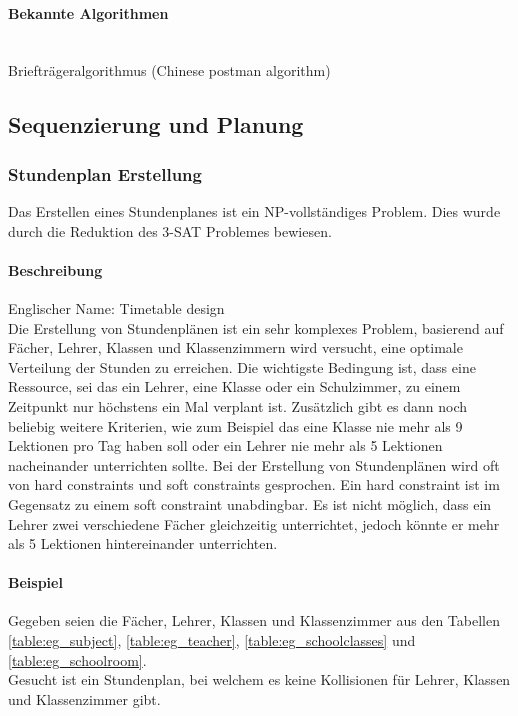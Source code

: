 	\paragraph{Bekannte Algorithmen}\mbox{}\\
	Briefträgeralgorithmus (Chinese postman algorithm)

\subsection{Sequenzierung und Planung}\label{sequencing_scheduling}

	\subsubsection{Stundenplan Erstellung}\label{tsp}
	Das Erstellen eines Stundenplanes ist ein NP-vollständiges Problem. Dies wurde durch die Reduktion des 3-SAT Problemes bewiesen.

	\paragraph{Beschreibung}
	Englischer Name: Timetable design\\
	Die Erstellung von Stundenplänen ist ein sehr komplexes Problem, basierend auf Fächer, Lehrer, Klassen und Klassenzimmern wird versucht, eine optimale Verteilung der Stunden zu 
	erreichen. Die wichtigste Bedingung ist, dass eine Ressource, sei das ein Lehrer, eine Klasse oder ein Schulzimmer, zu einem Zeitpunkt nur höchstens ein Mal verplant ist. 
	Zusätzlich gibt es dann noch beliebig weitere Kriterien, wie zum Beispiel das eine Klasse nie mehr als 9 Lektionen pro Tag haben soll oder ein Lehrer nie mehr als 
	5 Lektionen nacheinander unterrichten sollte. Bei der Erstellung von Stundenplänen wird oft von hard constraints und soft constraints gesprochen. Ein hard constraint ist im Gegensatz zu 
	einem soft constraint unabdingbar. Es ist nicht möglich, dass ein Lehrer zwei verschiedene Fächer gleichzeitig unterrichtet, jedoch könnte er mehr als 5 Lektionen hintereinander 
	unterrichten. \cite{Abramson92aparallel} \cite{Abramson91constructingschool} \cite{framework_timetabling} \cite{time_table_constraint_opti_ea}

	\paragraph{Beispiel} Gegeben seien die Fächer, Lehrer, Klassen und Klassenzimmer aus den Tabellen \ref{table:eg_subject}, \ref{table:eg_teacher}, \ref{table:eg_schoolclasses} und \ref{table:eg_schoolroom}.\\
Gesucht ist ein Stundenplan, bei welchem es keine Kollisionen für Lehrer, Klassen und Klassenzimmer gibt.

